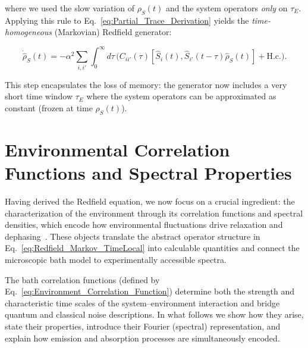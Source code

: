 \noindent
where we used the slow variation of $\rho_S(t)$ and the system operators \textit{only} on $\tau_E$. 
Applying this rule to Eq.~\eqref{eq:Partial_Trace_Derivation} yields the \emph{time-homogeneous} (Markovian) Redfield generator:

\begin{equation}
	\boxed{
		\dot{\hat{\rho}}_S(t) = - \alpha^2 \sum_{i,i'} \int_0^{\infty} d\tau \, \Big( C_{ii'}(\tau) [\hat{S}_i(t), \hat{S}_{i'}(t-\tau) \hat{\rho}_S(t)] + \text{H.c.}\Big).
	}
	\label{eq:Redfield_Markov_TimeLocal}
\end{equation}

\noindent
This step encapsulates the loss of memory: the generator now includes a very short time window $\tau_E$ where the system operators can be approximated as constant (frozen at time $\rho_S(t)$).


\section{Environmental Correlation Functions and Spectral Properties}
\label{sec:environmental_correlation_functions}

\noindent
Having derived the Redfield equation, we now focus on a crucial ingredient: the characterization of the environment through its correlation functions and spectral densities, which encode how environmental fluctuations drive relaxation and dephasing~\cite{breuerpetruccione2009theoryopenquantum, weiss2012quantumdissipativesystems}. These objects translate the abstract operator structure in Eq.~\eqref{eq:Redfield_Markov_TimeLocal} into calculable quantities and connect the microscopic bath model to experimentally accessible spectra.

\noindent
The bath correlation functions (defined by Eq.~\eqref{eq:Environment_Correlation_Function}) determine both the strength and characteristic time scales of the system--environment interaction and bridge quantum and classical noise descriptions. In what follows we show how they arise, state their properties, introduce their Fourier (spectral) representation, and explain how emission and absorption processes are simultaneously encoded.


\noindent
{}

